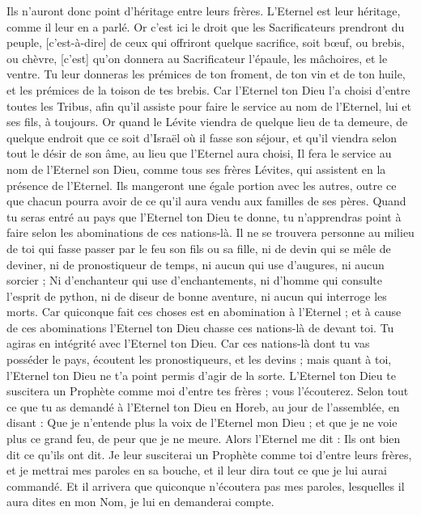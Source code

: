\begin{multicols}{2}
Ils n'auront donc point d'héritage entre leurs frères. L'Eternel est leur héritage, comme il leur en a parlé.
Or c'est ici le droit que les Sacrificateurs prendront du peuple, [c'est-à-dire] de ceux qui offriront quelque sacrifice, soit bœuf, ou brebis, ou chèvre, [c'est] qu'on donnera au Sacrificateur l'épaule, les mâchoires, et le ventre.
Tu leur donneras les prémices de ton froment, de ton vin et de ton huile, et les prémices de la toison de tes brebis.
Car l'Eternel ton Dieu l'a choisi d'entre toutes les Tribus, afin qu'il assiste pour faire le service au nom de l'Eternel, lui et ses fils, à toujours.
Or quand le Lévite viendra de quelque lieu de ta demeure, de quelque endroit que ce soit d'Israël où il fasse son séjour, et qu'il viendra selon tout le désir de son âme, au lieu que l'Eternel aura choisi,
Il fera le service au nom de l'Eternel son Dieu, comme tous ses frères Lévites, qui assistent en la présence de l'Eternel.
Ils mangeront une égale portion avec les autres, outre ce que chacun pourra avoir de ce qu'il aura vendu aux familles de ses pères.
Quand tu seras entré au pays que l'Eternel ton Dieu te donne, tu n'apprendras point à faire selon les abominations de ces nations-là.
Il ne se trouvera personne au milieu de toi qui fasse passer par le feu son fils ou sa fille, ni de devin qui se mêle de deviner, ni de pronostiqueur de temps, ni aucun qui use d'augures, ni aucun sorcier ;
Ni d'enchanteur qui use d'enchantements, ni d'homme qui consulte l'esprit de python, ni de diseur de bonne aventure, ni aucun qui interroge les morts.
Car quiconque fait ces choses est en abomination à l'Eternel ; et à cause de ces abominations l'Eternel ton Dieu chasse ces nations-là de devant toi.
Tu agiras en intégrité avec l'Eternel ton Dieu.
Car ces nations-là dont tu vas posséder le pays, écoutent les pronostiqueurs, et les devins ; mais quant à toi, l'Eternel ton Dieu ne t'a point permis d'agir de la sorte.
L'Eternel ton Dieu te suscitera un Prophète comme moi d'entre tes frères ; vous l'écouterez.
Selon tout ce que tu as demandé à l'Eternel ton Dieu en Horeb, au jour de l'assemblée, en disant : Que je n'entende plus la voix de l'Eternel mon Dieu ; et que je ne voie plus ce grand feu, de peur que je ne meure.
Alors l'Eternel me dit : Ils ont bien dit ce qu'ils ont dit.
Je leur susciterai un Prophète comme toi d'entre leurs frères, et je mettrai mes paroles en sa bouche, et il leur dira tout ce que je lui aurai commandé.
Et il arrivera que quiconque n'écoutera pas mes paroles, lesquelles il aura dites en mon Nom, je lui en demanderai compte.

\end{multicols}
